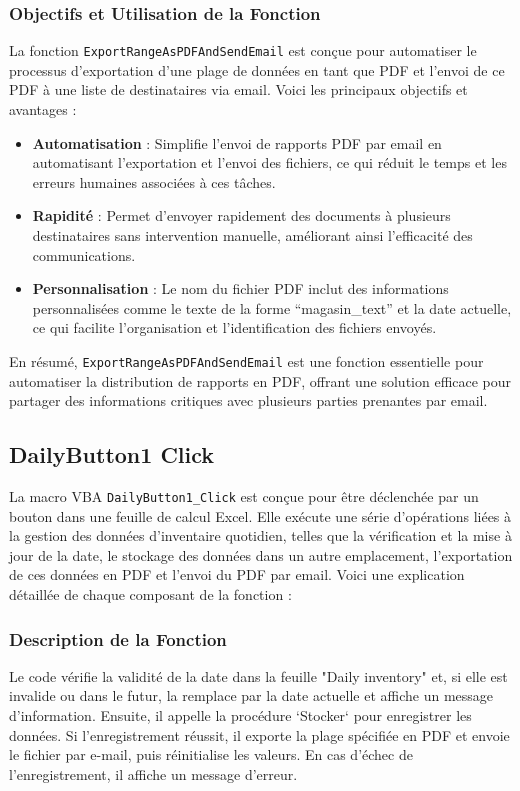 \documentclass[a4paper, oneside, 12pt, final]{extreport}
\begin{document}
\subsubsection{Objectifs et Utilisation de la Fonction}

La fonction \texttt{ExportRangeAsPDFAndSendEmail} est conçue pour automatiser le processus d'exportation d'une plage de données en tant que PDF et l'envoi de ce PDF à une liste de destinataires via email. Voici les principaux objectifs et avantages :

\begin{itemize}
    \item \textbf{Automatisation} : Simplifie l'envoi de rapports PDF par email en automatisant l'exportation et l'envoi des fichiers, ce qui réduit le temps et les erreurs humaines associées à ces tâches.
    \item \textbf{Rapidité} : Permet d'envoyer rapidement des documents à plusieurs destinataires sans intervention manuelle, améliorant ainsi l'efficacité des communications.
    \item \textbf{Personnalisation} : Le nom du fichier PDF inclut des informations personnalisées comme le texte de la forme ``magasin\_text'' et la date actuelle, ce qui facilite l'organisation et l'identification des fichiers envoyés.
\end{itemize}

En résumé, \texttt{ExportRangeAsPDFAndSendEmail} est une fonction essentielle pour automatiser la distribution de rapports en PDF, offrant une solution efficace pour partager des informations critiques avec plusieurs parties prenantes par email.
\subsection{DailyButton1 Click}

La macro VBA \texttt{DailyButton1\_Click} est conçue pour être déclenchée par un bouton dans une feuille de calcul Excel. Elle exécute une série d'opérations liées à la gestion des données d'inventaire quotidien, telles que la vérification et la mise à jour de la date, le stockage des données dans un autre emplacement, l'exportation de ces données en PDF et l'envoi du PDF par email. Voici une explication détaillée de chaque composant de la fonction :

\subsubsection{Description de la Fonction}
Le code vérifie la validité de la date dans la feuille "Daily inventory" et, si elle est invalide ou dans le futur, la remplace par la date actuelle et affiche un message d'information. Ensuite, il appelle la procédure `Stocker` pour enregistrer les données. Si l'enregistrement réussit, il exporte la plage spécifiée en PDF et envoie le fichier par e-mail, puis réinitialise les valeurs. En cas d'échec de l'enregistrement, il affiche un message d'erreur.
\end{document}
